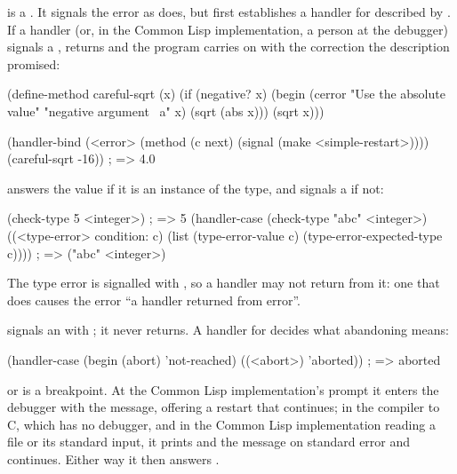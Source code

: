  is a . It signals the error
as  does, but first establishes a handler for
 described by . If a
handler (or, in the Common Lisp implementation, a person at the
debugger) signals a ,  returns
 and the program carries on with the correction the
description promised:

\begin{dylan}
(define-method careful-sqrt (x)
  (if (negative? x)
      (begin (cerror "Use the absolute value" "negative argument ~a" x)
             (sqrt (abs x)))
      (sqrt x)))

(handler-bind (<error> (method (c next) (signal (make <simple-restart>))))
  (careful-sqrt -16))                            ; => 4.0
\end{dylan}

 answers the value if it is
an instance of the type, and signals a  if not:

\begin{dylan}
(check-type 5 <integer>)        ; => 5
(handler-case (check-type "abc" <integer>)
  ((<type-error> condition: c)
   (list (type-error-value c) (type-error-expected-type c))))
; => ("abc" <integer>)
\end{dylan}

\noindent The type error is signalled with , so a handler may
not return from it: one that does causes the error ``a handler returned
from error''.

 signals an  with ; it never
returns. A handler for  decides what abandoning means:

\begin{dylan}
(handler-case (begin (abort) 'not-reached)
  ((<abort>) 'aborted))         ; => aborted
\end{dylan}

 or  is a
breakpoint. At the Common Lisp implementation's prompt it enters the
debugger with the message, offering a restart that continues; in the
compiler to C, which has no debugger, and in the Common Lisp
implementation reading a file or its standard input, it prints
 and the message on standard error and continues.
Either way it then answers .

